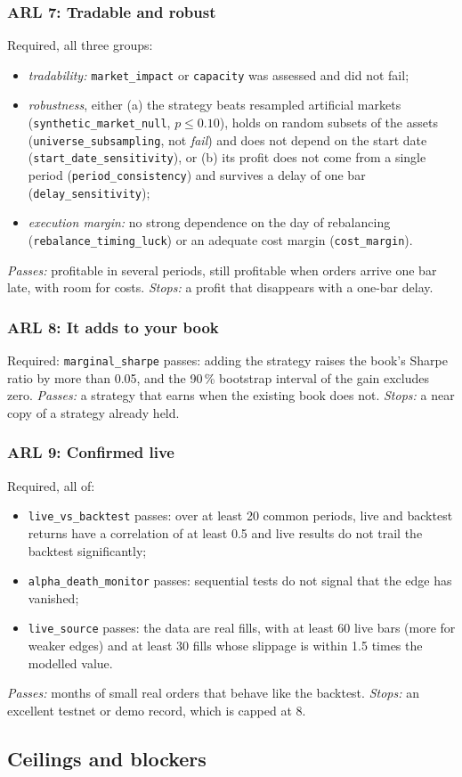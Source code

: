 \documentclass[11pt]{article}
\newcommand{\chk}[1]{\texttt{#1}}
\newcommand{\lvl}[2]{\subsubsection*{ARL #1: #2}}
\begin{document}
\lvl{7}{Tradable and robust}
Required, all three groups:
\begin{itemize}
\item \emph{tradability:} \chk{market\_impact} or \chk{capacity} was assessed and did not fail;
\item \emph{robustness}, either (a) the strategy beats resampled artificial markets
(\chk{synthetic\_market\_null}, $p\le 0.10$), holds on random subsets of the assets (\chk{universe\_subsampling}, not
\emph{fail}) and does not depend on the start date (\chk{start\_date\_sensitivity}), or (b) its profit does not come
from a single period (\chk{period\_consistency}) and survives a delay of one bar (\chk{delay\_sensitivity});
\item \emph{execution margin:} no strong dependence on the day of rebalancing (\chk{rebalance\_timing\_luck}) or an
adequate cost margin (\chk{cost\_margin}).
\end{itemize}
\emph{Passes:} profitable in several periods, still profitable when orders arrive one bar late, with room for costs.
\emph{Stops:} a profit that disappears with a one-bar delay.

\lvl{8}{It adds to your book}
Required: \chk{marginal\_sharpe} passes: adding the strategy raises the book's Sharpe ratio by more than 0.05, and the
90\,\% bootstrap interval of the gain excludes zero. \emph{Passes:} a strategy that earns when the existing book does
not. \emph{Stops:} a near copy of a strategy already held.

\lvl{9}{Confirmed live}
Required, all of:
\begin{itemize}
\item \chk{live\_vs\_backtest} passes: over at least 20 common periods, live and backtest returns have a correlation of
at least 0.5 and live results do not trail the backtest significantly;
\item \chk{alpha\_death\_monitor} passes: sequential tests do not signal that the edge has vanished;
\item \chk{live\_source} passes: the data are real fills, with at least 60 live bars (more for weaker edges) and at
least 30 fills whose slippage is within 1.5 times the modelled value.
\end{itemize}
\emph{Passes:} months of small real orders that behave like the backtest. \emph{Stops:} an excellent testnet or demo
record, which is capped at 8.

\subsection{Ceilings and blockers}\label{sec:caps}
\end{document}
